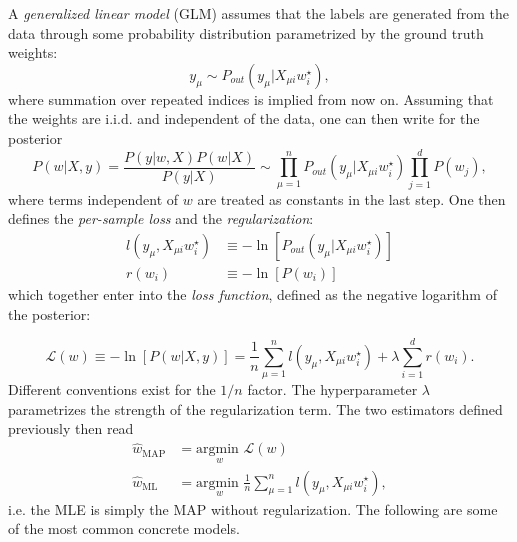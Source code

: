 \documentclass{article}
\begin{document}
A \emph{generalized linear model} (GLM) assumes that the labels are generated from the data through some probability distribution parametrized by the ground truth weights:
\begin{equation}
    y_{\mu} \sim P_{out} (y_{\mu} | X_{\mu i} w^{\star}_i),
\end{equation}
where summation over repeated indices is implied from now on. Assuming that the weights are i.i.d. and independent of the data, one can then write for the posterior
\begin{equation}
    P(w | X,y)
    =
    \frac{P(y | w,X) P(w|X)}{P(y|X)}
    \sim
    \prod_{\mu = 1}^{n} P_{out} (y_{\mu} | X_{\mu i} w^{\star}_i)
    \prod_{j = 1}^{d} P(w_j),
    \label{eq:linearposterior}
\end{equation}
where terms independent of $w$ are treated as constants in the last step. One then defines the \emph{per-sample loss} and the \emph{regularization}:
\begin{align}
    l(y_{\mu}, X_{\mu i} w^{\star}_i)
    &\equiv
    - \ln \left[P_{out} (y_{\mu} | X_{\mu i} w^{\star}_i)\right]\\
    r(w_i) &\equiv
    - \ln \left[P(w_i) \right]
\end{align}
which together enter into the \emph{loss function}, defined as the negative logarithm of the posterior:

\begin{equation}
    \boxed{
        \mathcal{L}(w)
        \equiv
        - \ln \left[P(w | X,y)\right]
        =
        \frac{1}{n}\sum_{\mu = 1}^{n} l(y_{\mu}, X_{\mu i} w^{\star}_i)
        +
        \lambda \sum_{i=1}^{d} r(w_i).
    }
\end{equation}
Different conventions exist for the $1/n$ factor. The hyperparameter $\lambda$ parametrizes the strength of the regularization term. The two estimators defined previously then read
\begin{align}
    \hat{w}_{\text{MAP}} &= \underset{w}{\text{argmin }} \mathcal{L}(w) \\
    \hat{w}_{\text{ML}} &= \underset{w}{\text{argmin }} \frac{1}{n}\sum_{\mu = 1}^{n} l(y_{\mu}, X_{\mu i} w^{\star}_i),
\end{align}
i.e. the MLE is simply the MAP without regularization. The following are some of the most common concrete models.
\end{document}
